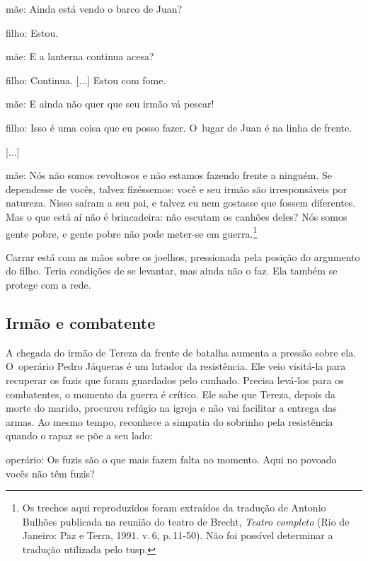 {\startblockquote
{\sc mãe}: Ainda está vendo o barco de Juan?

{\sc filho}: Estou.

{\sc mãe}: E a lanterna continua acesa?

{\sc filho}: Continua. {[}...{]} Estou com fome.

{\sc mãe}: E ainda não quer que seu irmão vá pescar!

{\sc filho}: Isso é uma coisa que eu posso fazer. O~lugar de Juan é na linha
de frente.

{[}...{]}

{\sc mãe}: Nós não somos revoltosos e não estamos fazendo frente a ninguém.
Se dependesse de vocês, talvez fizéssemos: você e seu irmão são
irresponsáveis por natureza. Nisso saíram a seu pai, e talvez eu nem
gostasse que fossem diferentes. Mas o que está aí não é brincadeira: não
escutam os canhões deles? Nós somos gente pobre, e gente pobre não pode
meter-se em guerra.\footnote{Os trechos aqui reproduzidos foram
  extraídos da tradução de Antonio Bulhões publicada na reunião do
  teatro de Brecht, {\it Teatro completo} (Rio de Janeiro: Paz e Terra,
  1991. v.\,6, p.\,11-50). Não foi possível determinar a tradução
  utilizada pelo {\sc tusp}.}
\stopblockquote

Carrar está com as mãos sobre os joelhos, pressionada pela posição do
argumento do filho. Teria condições de se levantar, mas ainda não o faz.
Ela também se protege com a rede.


\subsection{Irmão e combatente}

A chegada do irmão de Tereza da frente de batalha aumenta a pressão
sobre ela. O~operário Pedro Jáqueras é um lutador da resistência. Ele
veio visitá-la para recuperar os fuzis que foram guardados pelo cunhado.
Precisa levá-los para os combatentes, o momento da guerra é crítico. Ele
sabe que Tereza, depois da morte do marido, procurou refúgio na igreja e
não vai facilitar a entrega das armas. Ao mesmo tempo, reconhece a
simpatia do sobrinho pela resistência quando o rapaz se põe a seu lado:

\startblockquote
{\sc operário}: Os fuzis são o que mais fazem falta no momento. Aqui no
povoado vocês não têm fuzis?

}
